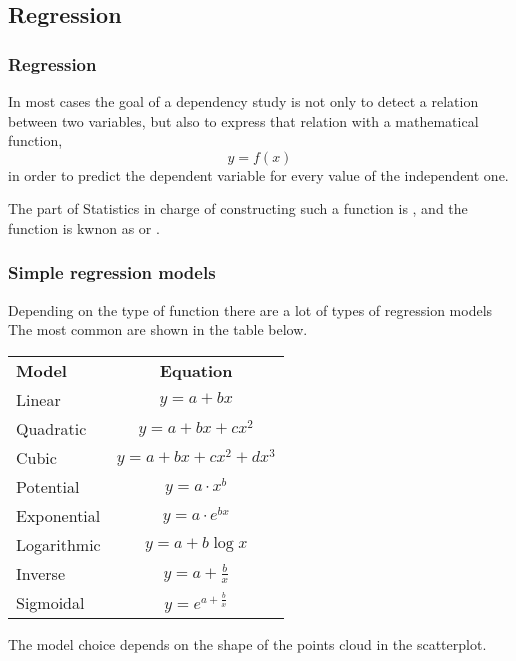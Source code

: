 \subsection{Regression}
\begin{frame}
\frametitle{Regression}
In most cases the goal of a dependency study is not only to detect a relation between two variables, but also to express
that relation with a mathematical function, 
\[y=f(x)\]
in order to predict the dependent variable for every value of the independent one.   

The part of Statistics in charge of constructing such a function is , and the function is kwnon
as  or .
\end{frame}


\begin{frame}
\frametitle{Simple regression models}
Depending on the type of function there are a lot of types of regression models
The most common are shown in the table below.

\begin{center}
\begin{tabular}{lc}
\toprule
\textbf{Model} & \textbf{Equation}\\
Linear & $y=a+bx$\\
Quadratic & $y=a+bx+cx^2$\\
Cubic & $y=a+bx+cx^2+dx^3$\\
Potential & $y=a\cdot x^b$\\
Exponential & $y=a\cdot e^{bx}$\\
Logarithmic & $y=a+b\log x$\\
Inverse & $y = a+\frac{b}{x}$\\
Sigmoidal & $y= e^{a+\frac{b}{x}}$\\
\bottomrule
\end{tabular}
\end{center}

The model choice depends on the shape of the points cloud in the scatterplot.
\end{frame}


